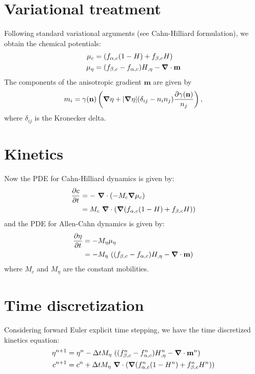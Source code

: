 \documentclass[10pt]{article}
\newcommand{\gv}[1]{\ensuremath{\mbox{\boldmath$ #1 $}}}
\newcommand{\grad}[1]{\gv{\nabla} #1}
\begin{document}
\section{Variational treatment}
Following standard variational arguments (see Cahn-Hilliard formulation), we obtain the chemical potentials:
\begin{align}
  \mu_{c}  &= (f_{\alpha,c}(1-H)+f_{\beta,c}H)  \\
  \mu_{\eta}  &= (f_{\beta,c}-f_{\alpha,c})H_{,\eta} - \grad \cdot \mathbf{m}
\end{align}
The components of the anisotropic gradient $\mathbf{m}$ are given by
\begin{equation}
m_i = \gamma(\mathbf{n}) \left( \grad \eta + |\grad \eta| (\delta_{ij}-n_i n_j) \frac{\partial \gamma (\mathbf{n})}{n_j} \right),
\end{equation}
where $\delta_{ij}$ is the Kronecker delta.

\section{Kinetics}
Now the PDE for Cahn-Hilliard dynamics is given by:
\begin{align}
  \frac{\partial c}{\partial t} &= -~\grad \cdot (-M_c\grad \mu_c)\\
  &=M_c~\grad \cdot (\grad (f_{\alpha,c}(1-H)+f_{\beta,c}H)) 
  \end{align}
  and the PDE for Allen-Cahn dynamics is given by:
  \begin{align}
    \frac{\partial \eta}{\partial t} &= -M_\eta \mu_\eta \\
  &=-M_\eta ~ ((f_{\beta,c}-f_{\alpha,c})H_{,\eta} - \grad \cdot \mathbf{m}) 
\end{align}
where $M_c$ and $M_\eta$ are the constant mobilities. 

\section{Time discretization}
Considering forward Euler explicit time stepping, we have the time discretized kinetics equation:
\begin{align}
 \eta^{n+1} &= \eta^{n}  - \Delta t M_{\eta}~ ((f_{\beta,c}^n-f_{\alpha,c}^n)H_{,\eta}^n -  \grad \cdot \mathbf{m}^n) \\
c^{n+1} &= c^{n}  + \Delta t M_{\eta}~\grad \cdot (\grad (f_{\alpha,c}^n(1-H^{n})+f_{\beta,c}^n H^{n}))
\end{align}
\end{document}
